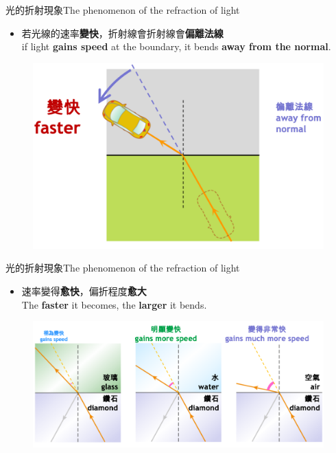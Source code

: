\documentclass[beamer=true]{standalone}
\begin{document}
\begin{frame}{光的折射現象The phenomenon of the refraction of light}
\begin{itemize}
    \item 若光線的速率\textbf{變快}，折射線會折射線會\textbf{偏離法線}\\if light \textbf{gains speed} at the boundary, it bends \textbf{away from the normal}.
\end{itemize}
    \begin{figure}
        \centering
        \includegraphics[width=.8\linewidth]{assets/3192803814912.png}
    \end{figure}
\end{frame}
\begin{frame}{光的折射現象The phenomenon of the refraction of light}
\begin{itemize}
    \item 速率變得\textbf{愈快}，偏折程度\textbf{愈大}\\The \textbf{faster} it becomes, the \textbf{larger} it bends.
\end{itemize}
    \begin{figure}
        \centering
        \includegraphics[width=1\linewidth]{assets/12803293age.png}
    \end{figure}
\end{frame}
\end{document}
